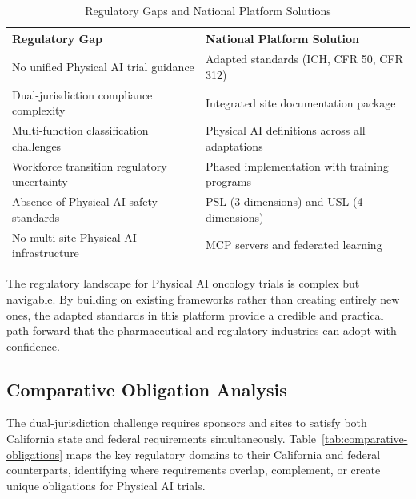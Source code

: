 \begin{table}[H]
\centering
\caption{Regulatory Gaps and National Platform Solutions}
\label{tab:gaps-solutions}
\small
\begin{tabularx}{\textwidth}{X X}
\toprule
\textbf{Regulatory Gap} & \textbf{National Platform Solution} \\
\midrule
No unified Physical AI trial guidance & Adapted standards (ICH, CFR 50, CFR 312) \\
Dual-jurisdiction compliance complexity & Integrated site documentation package \\
Multi-function classification challenges & Physical AI definitions across all adaptations \\
Workforce transition regulatory uncertainty & Phased implementation with training programs \\
Absence of Physical AI safety standards & PSL (3 dimensions) and USL (4 dimensions) \\
No multi-site Physical AI infrastructure & MCP servers and federated learning \\
\bottomrule
\end{tabularx}
\end{table}

The regulatory landscape for Physical AI oncology trials is complex but
navigable. By building on existing frameworks rather than creating entirely new
ones, the adapted standards in this platform \cite{ich-adapt, cfr50-adapt,
cfr312-adapt} provide a credible and practical path forward that the
pharmaceutical and regulatory industries can adopt with confidence.

\subsection{Comparative Obligation Analysis}
\label{subsec:comparative-obligations}

The dual-jurisdiction challenge requires sponsors and sites to satisfy both
California state and federal requirements simultaneously. Table~\ref{tab:comparative-obligations}
maps the key regulatory domains to their California and federal counterparts,
identifying where requirements overlap, complement, or create unique obligations
for Physical AI trials.

